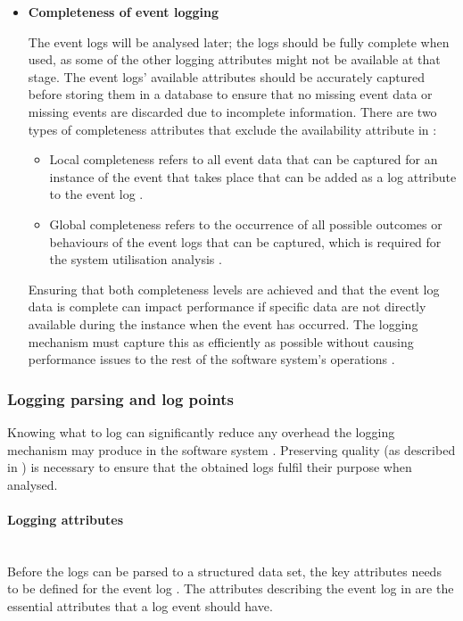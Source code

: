 \begin{itemize}
	\item \textbf{Completeness of event logging}\par The event logs will be analysed later; the logs should be fully complete when used, as some of the other logging attributes might not be available at that stage. The event logs' available attributes should be accurately captured before storing them in a database to ensure that no missing event data or missing events are discarded due to incomplete information. There are two types of completeness attributes that exclude the availability attribute in :

	\begin{itemize}
		\item Local completeness refers to all event data that can be captured for an instance of the event that takes place that can be added as a log attribute to the event log \cite{Kherbouche2017, VanDerAalst2004}.
		\item Global completeness refers to the occurrence of all possible outcomes or behaviours of the event logs that can be captured, which is required for the system utilisation analysis \cite{Kherbouche2017, VanDerAalst2004}.
	\end{itemize}

	Ensuring that both completeness levels are achieved and that the event log data is complete can impact performance if specific data are not directly available during the instance when the event has occurred. The logging mechanism must capture this as efficiently as possible without causing performance issues to the rest of the software system's operations \cite{Zhu2015, Zhu2019}. 
\end{itemize}

\subsubsection{Logging parsing and log points}\label{sec:ch1_loggignPoints}
Knowing what to log can significantly reduce any overhead the logging mechanism may produce in the software system \cite{Jia2018, Pecchia2015}. Preserving quality (as described in ) is necessary to ensure that the obtained logs fulfil their purpose when analysed.

\paragraph{Logging attributes}\leavevmode\\
Before the logs can be parsed to a structured data set, the key attributes needs to be defined for the event log \cite{Bekeneva2020}. The attributes describing the event log in  are the essential attributes that a log event should have. 

